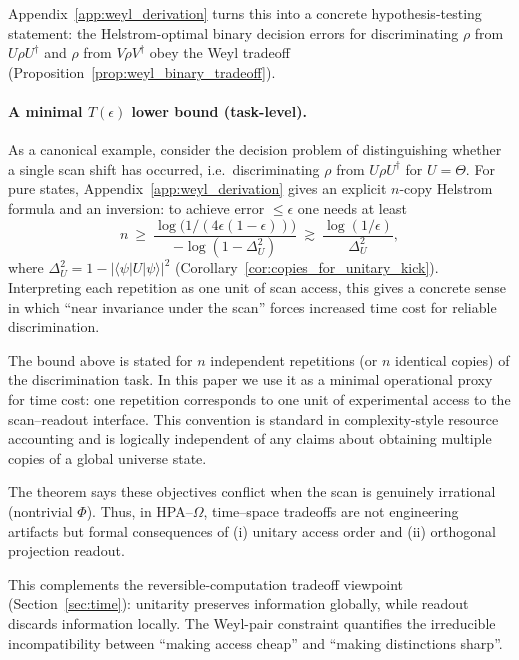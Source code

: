 \noindent Appendix~\ref{app:weyl_derivation} turns this into a concrete hypothesis-testing statement: the Helstrom-optimal binary decision errors for discriminating $\rho$ from $U\rho U^{\dagger}$ and $\rho$ from $V\rho V^{\dagger}$ obey the Weyl tradeoff (Proposition~\ref{prop:weyl_binary_tradeoff}).

\paragraph{A minimal $T(\epsilon)$ lower bound (task-level).}
As a canonical example, consider the decision problem of distinguishing whether a single scan shift has occurred, i.e.\ discriminating $\rho$ from $U\rho U^{\dagger}$ for $U=\Theta$.
For pure states, Appendix~\ref{app:weyl_derivation} gives an explicit $n$-copy Helstrom formula and an inversion: to achieve error $\le\epsilon$ one needs at least
\begin{equation}
n\ \ge\ \frac{\log\!\bigl(1/(4\epsilon(1-\epsilon))\bigr)}{-\log(1-\Delta_U^2)}
\ \gtrsim\ \frac{\log(1/\epsilon)}{\Delta_U^2},
\end{equation}
where $\Delta_U^2=1-|\langle\psi|U|\psi\rangle|^2$ (Corollary~\ref{cor:copies_for_unitary_kick}).
Interpreting each repetition as one unit of scan access, this gives a concrete sense in which ``near invariance under the scan'' forces increased time cost for reliable discrimination.
\begin{remark}
The bound above is stated for $n$ independent repetitions (or $n$ identical copies) of the discrimination task.
In this paper we use it as a minimal operational proxy for time cost: one repetition corresponds to one unit of experimental access to the scan--readout interface.
This convention is standard in complexity-style resource accounting and is logically independent of any claims about obtaining multiple copies of a global universe state.
\end{remark}

\noindent The theorem says these objectives conflict when the scan is genuinely irrational (nontrivial $\Phi$). Thus, in HPA--$\Omega$, time--space tradeoffs are not engineering artifacts but formal consequences of (i) unitary access order and (ii) orthogonal projection readout.

This complements the reversible-computation tradeoff viewpoint (Section~\ref{sec:time}): unitarity preserves information globally, while readout discards information locally. The Weyl-pair constraint quantifies the irreducible incompatibility between ``making access cheap'' and ``making distinctions sharp''.
